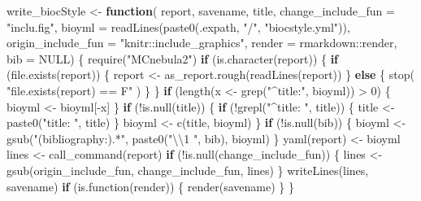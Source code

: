 \documentclass[
]{article}
\newenvironment{Shaded}{\begin{snugshade}}{\end{snugshade}}
\newcommand{\AttributeTok}[1]{\textcolor[rgb]{0.77,0.63,0.00}{#1}}
\newcommand{\ConstantTok}[1]{\textcolor[rgb]{0.00,0.00,0.00}{#1}}
\newcommand{\ControlFlowTok}[1]{\textcolor[rgb]{0.13,0.29,0.53}{\textbf{#1}}}
\newcommand{\DecValTok}[1]{\textcolor[rgb]{0.00,0.00,0.81}{#1}}
\newcommand{\FunctionTok}[1]{\textcolor[rgb]{0.00,0.00,0.00}{#1}}
\newcommand{\NormalTok}[1]{#1}
\newcommand{\OtherTok}[1]{\textcolor[rgb]{0.56,0.35,0.01}{#1}}
\newcommand{\SpecialCharTok}[1]{\textcolor[rgb]{0.00,0.00,0.00}{#1}}
\newcommand{\StringTok}[1]{\textcolor[rgb]{0.31,0.60,0.02}{#1}}
\begin{document}
\begin{Shaded}
\begin{Highlighting}[]
\NormalTok{write\_biocStyle }\OtherTok{\textless{}{-}} \ControlFlowTok{function}\NormalTok{(}
\NormalTok{  report, savename, title, }\AttributeTok{change\_include\_fun =} \StringTok{"inclu.fig"}\NormalTok{,}
  \AttributeTok{bioyml =} \FunctionTok{readLines}\NormalTok{(}\FunctionTok{paste0}\NormalTok{(.expath, }\StringTok{"/"}\NormalTok{, }\StringTok{"biocstyle.yml"}\NormalTok{)),}
  \AttributeTok{origin\_include\_fun =} \StringTok{"knitr::include\_graphics"}\NormalTok{,}
  \AttributeTok{render =}\NormalTok{ rmarkdown}\SpecialCharTok{::}\NormalTok{render,}
  \AttributeTok{bib =} \ConstantTok{NULL}\NormalTok{)}
\NormalTok{\{}
  \FunctionTok{require}\NormalTok{(}\StringTok{"MCnebula2"}\NormalTok{)}
  \ControlFlowTok{if}\NormalTok{ (}\FunctionTok{is.character}\NormalTok{(report)) \{}
    \ControlFlowTok{if}\NormalTok{ (}\FunctionTok{file.exists}\NormalTok{(report)) \{}
\NormalTok{      report }\OtherTok{\textless{}{-}} \FunctionTok{as\_report.rough}\NormalTok{(}\FunctionTok{readLines}\NormalTok{(report))}
\NormalTok{    \} }\ControlFlowTok{else}\NormalTok{ \{}
      \FunctionTok{stop}\NormalTok{( }\StringTok{"file.exists(report) == F"}\NormalTok{ )}
\NormalTok{    \}}
\NormalTok{  \}}
  \ControlFlowTok{if}\NormalTok{ (}\FunctionTok{length}\NormalTok{(x }\OtherTok{\textless{}{-}} \FunctionTok{grep}\NormalTok{(}\StringTok{"\^{}title:"}\NormalTok{, bioyml)) }\SpecialCharTok{\textgreater{}} \DecValTok{0}\NormalTok{) \{}
\NormalTok{    bioyml }\OtherTok{\textless{}{-}}\NormalTok{ bioyml[}\SpecialCharTok{{-}}\NormalTok{x]}
\NormalTok{  \}}
  \ControlFlowTok{if}\NormalTok{ (}\SpecialCharTok{!}\FunctionTok{is.null}\NormalTok{(title)) \{}
    \ControlFlowTok{if}\NormalTok{ (}\SpecialCharTok{!}\FunctionTok{grepl}\NormalTok{(}\StringTok{"\^{}title: "}\NormalTok{, title)) \{}
\NormalTok{      title }\OtherTok{\textless{}{-}} \FunctionTok{paste0}\NormalTok{(}\StringTok{"title: "}\NormalTok{, title)}
\NormalTok{    \}}
\NormalTok{    bioyml }\OtherTok{\textless{}{-}} \FunctionTok{c}\NormalTok{(title, bioyml)}
\NormalTok{  \}}
  \ControlFlowTok{if}\NormalTok{ (}\SpecialCharTok{!}\FunctionTok{is.null}\NormalTok{(bib)) \{}
\NormalTok{    bioyml }\OtherTok{\textless{}{-}} \FunctionTok{gsub}\NormalTok{(}\StringTok{"(bibliography:).*"}\NormalTok{, }\FunctionTok{paste0}\NormalTok{(}\StringTok{"}\SpecialCharTok{\textbackslash{}\textbackslash{}}\StringTok{1 "}\NormalTok{, bib), bioyml)}
\NormalTok{  \}}
  \FunctionTok{yaml}\NormalTok{(report) }\OtherTok{\textless{}{-}}\NormalTok{ bioyml}
\NormalTok{  lines }\OtherTok{\textless{}{-}} \FunctionTok{call\_command}\NormalTok{(report)}
  \ControlFlowTok{if}\NormalTok{ (}\SpecialCharTok{!}\FunctionTok{is.null}\NormalTok{(change\_include\_fun)) \{}
\NormalTok{    lines }\OtherTok{\textless{}{-}} \FunctionTok{gsub}\NormalTok{(origin\_include\_fun, change\_include\_fun, lines)}
\NormalTok{  \}}
  \FunctionTok{writeLines}\NormalTok{(lines, savename)}
  \ControlFlowTok{if}\NormalTok{ (}\FunctionTok{is.function}\NormalTok{(render)) \{}
    \FunctionTok{render}\NormalTok{(savename)}
\NormalTok{  \}}
\NormalTok{\}}


\end{Highlighting}
\end{Shaded}
\end{document}
